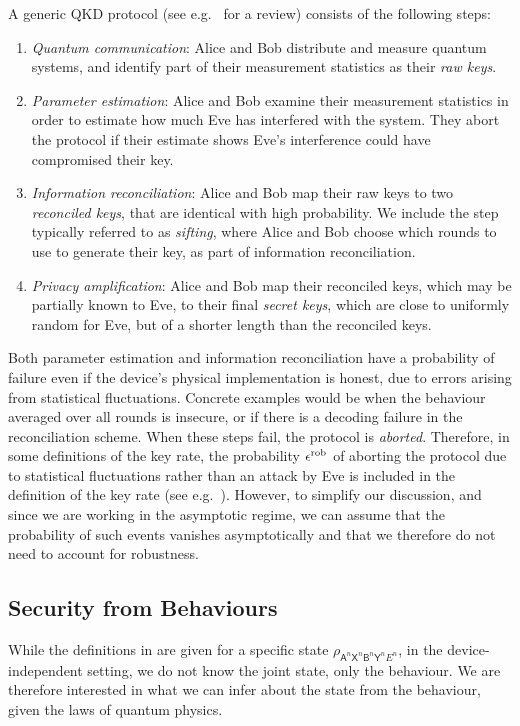 \documentclass[10pt, a4paper]{article}
\numberwithin{equation}{section} %
\theoremstyle{definition}
\theoremstyle{plain}
\newcommand{\?}{\mathrel{?}} %
\newcommand{\crv}[1]{\mathsf{#1}}
\newcommand{\rob}{\rm rob}
\newcommand{\erob}[1][]{\epsilon^{\rob}_{#1}}
\begin{document}
    A generic QKD protocol (see e.g.~\cite{PracticalQKD} for a review) consists of the following steps:
  \begin{enumerate}
    \item \emph{Quantum communication}: Alice and Bob distribute and measure quantum systems, and identify part of their measurement statistics as their \emph{raw keys}.
    \item \emph{Parameter estimation}: Alice and Bob examine their measurement statistics in order to estimate how much Eve has interfered with the system. They abort the protocol if their estimate shows Eve's interference could have compromised their key.
    \item \emph{Information reconciliation}: Alice and Bob map their raw keys to two \emph{reconciled keys}, that are identical with high probability. We include the step typically referred to as \emph{sifting}, where Alice and Bob choose which rounds to use to generate their key, as part of information reconciliation.
    \item \emph{Privacy amplification}: Alice and Bob map their reconciled keys, which may be partially known to Eve, to their final \emph{secret keys}, which are close to uniformly random for Eve, but of a shorter length than the reconciled keys.
\end{enumerate}
    Both parameter estimation and information reconciliation have a probability of failure even if the device's physical implementation is honest, due to errors arising from statistical fluctuations. Concrete examples would be when the behaviour averaged over all rounds is insecure, or if there is a decoding failure in the reconciliation scheme. When these steps fail, the protocol is \emph{aborted}. Therefore, in some definitions of the key rate, the probability \(\erob\) of aborting the protocol due to statistical fluctuations rather than an attack by Eve is included in the definition of the key rate (see e.g.~\cite{SecurityQKD, CompleteSecurityProof}). However, to simplify our discussion, and since we are working in the asymptotic regime, we can assume that the probability of such events vanishes asymptotically and that we therefore do not need to account for robustness.

  \subsection{Security from Behaviours}\label{sec:diqkd_behavsec}

    While the definitions in  are given for a specific state \(\rho_{\crv{A}^n\crv{X}^n \crv{B}^n\crv{Y}^n E^n}\), in the device-independent setting, we do not know the joint state, only the behaviour. We are therefore interested in what we can infer about the state from the behaviour, given the laws of quantum physics.
\end{document}
